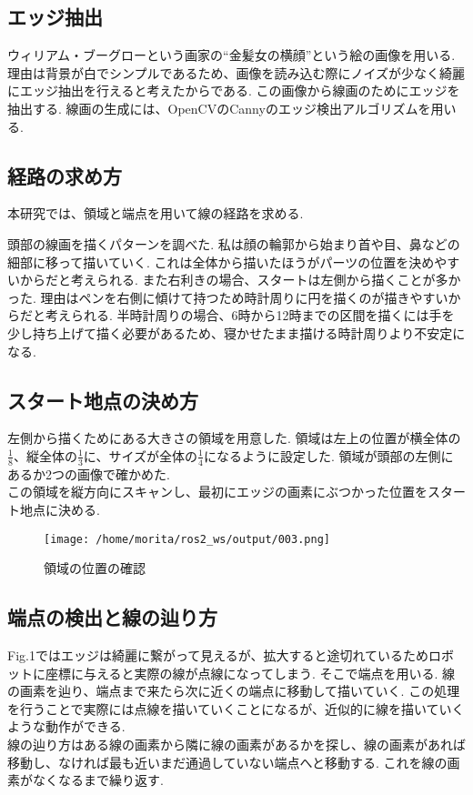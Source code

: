 \documentclass[10pt]{jarticle}
\begin{document}
	\normalsize

	\subsection{エッジ抽出}
	ウィリアム・ブーグローという画家の``金髪女の横顔''という絵の画像を用いる.
	理由は背景が白でシンプルであるため、画像を読み込む際にノイズが少なく綺麗にエッジ抽出を行えると考えたからである.
	この画像から線画のためにエッジを抽出する.
	線画の生成には、OpenCVのCannyのエッジ検出アルゴリズムを用いる.
	
	
	\subsection{経路の求め方}
	本研究では、領域と端点を用いて線の経路を求める.

	頭部の線画を描くパターンを調べた.
	私は顔の輪郭から始まり首や目、鼻などの細部に移って描いていく.
	これは全体から描いたほうがパーツの位置を決めやすいからだと考えられる.
	また右利きの場合、スタートは左側から描くことが多かった.
	理由はペンを右側に傾けて持つため時計周りに円を描くのが描きやすいからだと考えられる.
	半時計周りの場合、6時から12時までの区間を描くには手を少し持ち上げて描く必要があるため、寝かせたまま描ける時計周りより不安定になる.
	
	\subsection{スタート地点の決め方}

	左側から描くためにある大きさの領域を用意した.
	領域は左上の位置が横全体の$\frac{1}{8}$、縦全体の$\frac{1}{3}$に、サイズが全体の$\frac{1}{4}$になるように設定した.
	領域が頭部の左側にあるか2つの画像で確かめた.
	\\この領域を縦方向にスキャンし、最初にエッジの画素にぶつかった位置をスタート地点に決める.

    \begin{center}
        \begin{figure}[h]
            \texttt{[image: /home/morita/ros2\_ws/output/003.png]}
            \caption{領域の位置の確認}
            \label{the position of a region}
        \end{figure}
    \end{center}
	

	\subsection{端点の検出と線の辿り方}
	Fig.1ではエッジは綺麗に繋がって見えるが、拡大すると途切れているためロボットに座標に与えると実際の線が点線になってしまう.
	そこで端点を用いる.
	線の画素を辿り、端点まで来たら次に近くの端点に移動して描いていく.
	この処理を行うことで実際には点線を描いていくことになるが、近似的に線を描いていくような動作ができる.
  \\ 
	線の辿り方はある線の画素から隣に線の画素があるかを探し、線の画素があれば移動し、なければ最も近いまだ通過していない端点へと移動する.
	これを線の画素がなくなるまで繰り返す.
	
\end{document}
